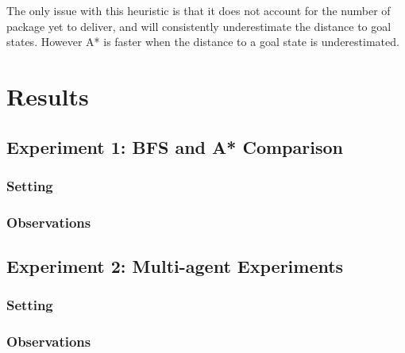 \documentclass[11pt]{article}
\begin{document}
The only issue with this heuristic is that it does not account for the
number of package yet to deliver, and will consistently underestimate
the distance to goal states. However A* is faster when the distance to
a goal state is underestimated.

\section{Results}

\subsection{Experiment 1: BFS and A* Comparison}

\subsubsection{Setting}

\subsubsection{Observations}


\subsection{Experiment 2: Multi-agent Experiments}

\subsubsection{Setting}

\subsubsection{Observations}
\end{document}
